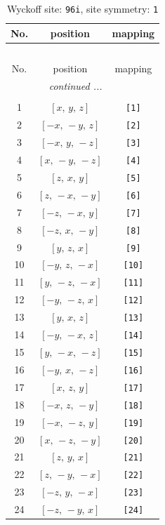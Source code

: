 \documentclass[fleqn,8pt]{jsarticle}
\begin{document}
\begin{longtable}{ccc}
\caption{Wyckoff site: {\tt 96i}, site symmetry: {\tt 1}}
 \\
 \hline \hline
No. & position & mapping \\ \hline \endfirsthead

\multicolumn{2}{l}{\tablename\ \thetable{}} \\
 \hline \hline
No. & position & mapping \\ \hline \endhead

 \hline \hline
\multicolumn{2}{r}{\footnotesize\it continued ...} \\ \endfoot

 \hline \hline
\multicolumn{2}{r}{} \\ \endlastfoot

1 & $\left[ x,\, y,\, z \right]$ & {\tt [1]} \\ \hline
2 & $\left[ - x,\, - y,\, z \right]$ & {\tt [2]} \\ \hline
3 & $\left[ - x,\, y,\, - z \right]$ & {\tt [3]} \\ \hline
4 & $\left[ x,\, - y,\, - z \right]$ & {\tt [4]} \\ \hline
5 & $\left[ z,\, x,\, y \right]$ & {\tt [5]} \\ \hline
6 & $\left[ z,\, - x,\, - y \right]$ & {\tt [6]} \\ \hline
7 & $\left[ - z,\, - x,\, y \right]$ & {\tt [7]} \\ \hline
8 & $\left[ - z,\, x,\, - y \right]$ & {\tt [8]} \\ \hline
9 & $\left[ y,\, z,\, x \right]$ & {\tt [9]} \\ \hline
10 & $\left[ - y,\, z,\, - x \right]$ & {\tt [10]} \\ \hline
11 & $\left[ y,\, - z,\, - x \right]$ & {\tt [11]} \\ \hline
12 & $\left[ - y,\, - z,\, x \right]$ & {\tt [12]} \\ \hline
13 & $\left[ y,\, x,\, z \right]$ & {\tt [13]} \\ \hline
14 & $\left[ - y,\, - x,\, z \right]$ & {\tt [14]} \\ \hline
15 & $\left[ y,\, - x,\, - z \right]$ & {\tt [15]} \\ \hline
16 & $\left[ - y,\, x,\, - z \right]$ & {\tt [16]} \\ \hline
17 & $\left[ x,\, z,\, y \right]$ & {\tt [17]} \\ \hline
18 & $\left[ - x,\, z,\, - y \right]$ & {\tt [18]} \\ \hline
19 & $\left[ - x,\, - z,\, y \right]$ & {\tt [19]} \\ \hline
20 & $\left[ x,\, - z,\, - y \right]$ & {\tt [20]} \\ \hline
21 & $\left[ z,\, y,\, x \right]$ & {\tt [21]} \\ \hline
22 & $\left[ z,\, - y,\, - x \right]$ & {\tt [22]} \\ \hline
23 & $\left[ - z,\, y,\, - x \right]$ & {\tt [23]} \\ \hline
24 & $\left[ - z,\, - y,\, x \right]$ & {\tt [24]} \\
\end{longtable}
\end{document}
